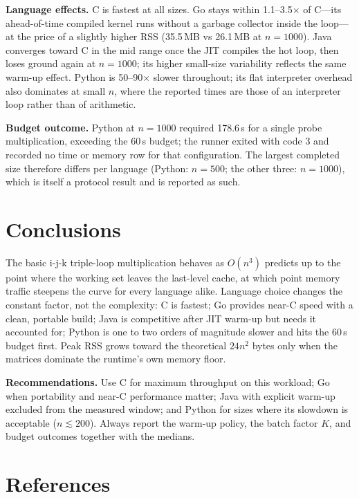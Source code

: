 \documentclass[11pt,a4paper]{article}
\begin{document}
\textbf{Language effects.} C is fastest at all sizes. Go stays within
1.1--3.5$\times$ of C---its ahead-of-time compiled kernel runs without a
garbage collector inside the loop---at the price of a slightly higher RSS
(35.5\,MB vs 26.1\,MB at \(n=1000\)). Java converges toward C in the mid range
once the JIT compiles the hot loop, then loses ground again at \(n=1000\); its
higher small-size variability reflects the same warm-up effect. Python is
50--90$\times$ slower throughout; its flat interpreter overhead also dominates
at small \(n\), where the reported times are those of an interpreter loop
rather than of arithmetic.

\textbf{Budget outcome.} Python at \(n=1000\) required 178.6\,s for a single
probe multiplication, exceeding the 60\,s budget; the runner exited with code 3
and recorded no time or memory row for that configuration. The largest
completed size therefore differs per language (Python: \(n=500\); the other
three: \(n=1000\)), which is itself a protocol result and is reported as such.

\section{Conclusions}

The basic i-j-k triple-loop multiplication behaves as \(O(n^3)\) predicts up to
the point where the working set leaves the last-level cache, at which point
memory traffic steepens the curve for every language alike. Language choice
changes the constant factor, not the complexity: C is fastest; Go provides
near-C speed with a clean, portable build; Java is competitive after JIT
warm-up but needs it accounted for; Python is one to two orders of magnitude
slower and hits the 60\,s budget first. Peak RSS grows toward the theoretical
\(24n^2\) bytes only when the matrices dominate the runtime's own memory floor.

\textbf{Recommendations.} Use C for maximum throughput on this workload; Go
when portability and near-C performance matter; Java with explicit warm-up
excluded from the measured window; and Python for sizes where its slowdown is
acceptable (\(n \lesssim 200\)). Always report the warm-up policy, the batch
factor \(K\), and budget outcomes together with the medians.

\section{References}
\end{document}
